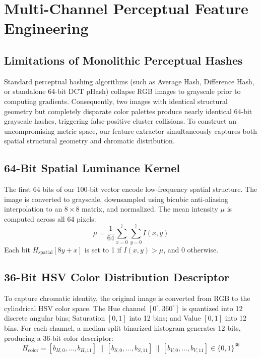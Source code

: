 \documentclass[11pt,a4paper]{article}
\begin{document}
\section{Multi-Channel Perceptual Feature Engineering}
\subsection{Limitations of Monolithic Perceptual Hashes}
Standard perceptual hashing algorithms (such as Average Hash, Difference Hash, or standalone 64-bit DCT pHash) collapse RGB images to grayscale prior to computing gradients. Consequently, two images with identical structural geometry but completely disparate color palettes produce nearly identical 64-bit grayscale hashes, triggering false-positive cluster collisions. To construct an uncompromising metric space, our feature extractor simultaneously captures both spatial structural geometry and chromatic distribution.

\subsection{64-Bit Spatial Luminance Kernel}
The first 64 bits of our 100-bit vector encode low-frequency spatial structure. The image is converted to grayscale, downsampled using bicubic anti-aliasing interpolation to an $8 \times 8$ matrix, and normalized. The mean intensity $\mu$ is computed across all 64 pixels:
\begin{equation}
\mu = \frac{1}{64} \sum_{x=0}^{7} \sum_{y=0}^{7} I(x, y)
\end{equation}
Each bit $H_{\text{spatial}}[8y + x]$ is set to 1 if $I(x, y) > \mu$, and 0 otherwise.

\subsection{36-Bit HSV Color Distribution Descriptor}
To capture chromatic identity, the original image is converted from RGB to the cylindrical HSV color space. The Hue channel $[0^\circ, 360^\circ]$ is quantized into 12 discrete angular bins; Saturation $[0, 1]$ into 12 bins; and Value $[0, 1]$ into 12 bins. For each channel, a median-split binarized histogram generates 12 bits, producing a 36-bit color descriptor:
\begin{equation}
H_{\text{color}} = [b_{H,0}, \dots, b_{H,11}] \,\|\, [b_{S,0}, \dots, b_{S,11}] \,\|\, [b_{V,0}, \dots, b_{V,11}] \in \{0, 1\}^{36}
\end{equation}
\end{document}
